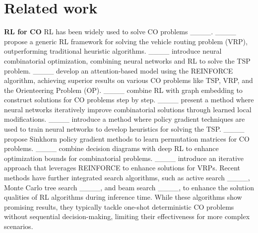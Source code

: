 \section{Related work}


\textbf{RL for CO}\quad
RL has been widely used to solve CO problems ____. ____ propose a generic RL framework for solving the vehicle routing problem (VRP), outperforming traditional heuristic algorithms. ____ introduce neural combinatorial optimization, combining neural networks and RL to solve the TSP problem. ____ develop an attention-based model using the REINFORCE algorithm, achieving superior results on various CO problems like TSP, VRP, and the Orienteering Problem (OP). ____ combine RL with graph embedding to construct solutions for CO problems step by step. ____ present a method where neural networks iteratively improve combinatorial solutions through learned local modifications. ____ introduce a method where policy gradient techniques are used to train neural networks to develop heuristics for solving the TSP. ____ propose Sinkhorn policy gradient methods to learn permutation matrices for CO problems. ____ combine decision diagrams with deep RL to enhance optimization bounds for combinatorial problems. ____ introduce an iterative approach that leverages REINFORCE to enhance solutions for VRPs. Recent methods have further integrated search algorithms, such as active search ____, Monte Carlo tree search ____, and beam search ____, to enhance the solution qualities of RL algorithms during inference time. While these algorithms show promising results, they typically tackle one-shot deterministic CO problems without sequential decision-making, limiting their effectiveness for more complex scenarios.

